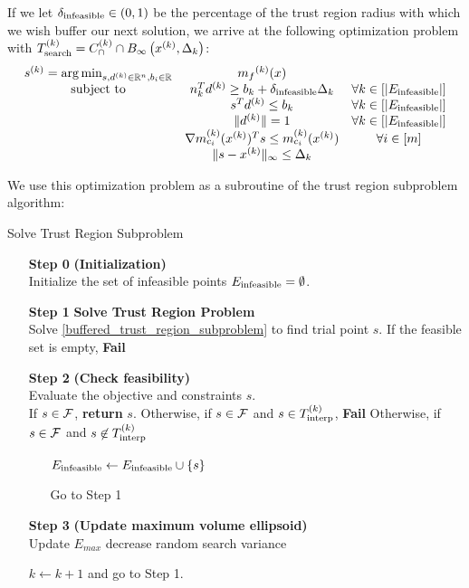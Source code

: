 If we let ${\delta_\textrm{infeasible}} \in (0, 1)$ be the percentage of the trust region radius with which we wish buffer our next solution, 
we arrive at the following optimization problem with ${T_{\text{search}}^{(k)}} = {C^{(k)}_{\cap}} \cap { B_{\infty}\left(x^{(k)}, \Delta_k\right) } $:
\begin{align}
\label{buffered_trust_region_subproblem}
\begin{array}{ccc}
{{s}^{(k)}} = \operatorname*{arg\,min}_{s, d^{(k)} \in \mathbb R^n, b_i \in \mathbb R}	& {{m}_f}^{(k)}(x) & 	\\
 \mbox{subject to}  & n_k^Td^{(k)} \ge b_k + {\delta_\textrm{infeasible}} \Delta_k& \forall k \in \left[ |{E_\textrm{infeasible}} |\right] \\
 & s^T d^{(k)} \le b_k &   \forall k \in \left[|{E_\textrm{infeasible}} |\right]  \\
 & \|d^{(k)}\| = 1 & \forall k \in \left[|{E_\textrm{infeasible}} |	\right]\\
 & \nabla {{m}^{(k)}_{c_i}}(x^{(k)}) ^T s \le {{m}^{(k)}_{c_i}}(x^{(k)}) & \forall i \in [m] \\
 & \|s - x^{(k)} \|_{\infty} \le \Delta_k & \\
\end{array}
\end{align}

We use this optimization problem as a subroutine of the trust region subproblem algorithm:

\begin{algorithm}[H]
    \caption{Solve Trust Region Subproblem}
    \label{linear_cut_trust_region_subproblem}
    \begin{itemize}
        \item[\textbf{Step 0}] \textbf{(Initialization)} \\
	    Initialize the set of infeasible points ${E_\textrm{infeasible}} = \emptyset$.
        
        \item[\textbf{Step 1}] \textbf{Solve Trust Region Problem} \\
	    Solve \cref{buffered_trust_region_subproblem} to find trial point $s$.
	    If the feasible set is empty, \textbf{Fail}
        
        \item[\textbf{Step 2}] \textbf{(Check feasibility)} \\
            Evaluate the objective and constraints $s$. \\
            If $s\in{\mathcal F}$, \textbf{return} $s$.
            Otherwise, if $s\in{\mathcal F}$ and $s \in {T_{\text{interp}}^{(k)}}$, \textbf{Fail}
	    Otherwise, if $s\in{\mathcal F}$ and $s \not \in {T_{\text{interp}}^{(k)}}$ \begin{itemize}
	    	\item[] ${E_\textrm{infeasible}} \gets {E_\textrm{infeasible}} \cup \{s\}$
	    	\item[] Go to Step 1
	    \end{itemize}
            
        \item[\textbf{Step 3}] \textbf{(Update maximum volume ellipsoid)} \\
	    Update $E_{max}$
	    decrease random search variance
            
        $k \gets k+1$ and go to Step 1.
    \end{itemize}
\end{algorithm}

